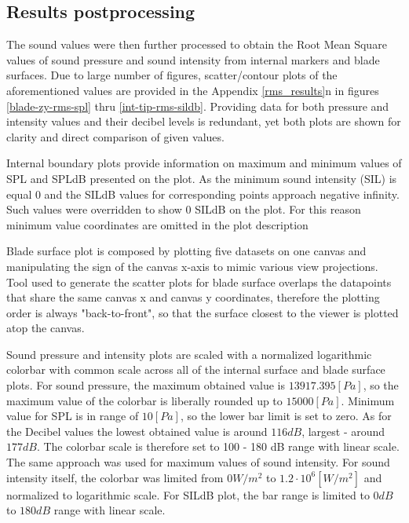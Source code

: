 \subsection{Results postprocessing} \label{rms_res_prep}
The sound values were then further processed to obtain the Root Mean Square values of sound pressure and sound intensity from internal markers and blade surfaces. Due to large number of figures, scatter/contour plots of the aforementioned values are provided in the Appendix \ref{rms_results}n in figures \ref{blade-zy-rms-spl} thru \ref{int-tip-rms-sildb}. Providing data for both pressure and intensity values and their decibel levels is redundant, yet both plots are shown for clarity and direct comparison of given values. 

Internal boundary plots provide information on maximum and minimum values of SPL and SPLdB presented on the plot. As the minimum sound intensity (SIL) is equal 0 and the SILdB values for corresponding points approach negative infinity. Such values were overridden to show 0 SILdB on the plot.    For this reason minimum value coordinates are omitted in the plot description 

Blade surface plot is composed by plotting five datasets on one canvas and manipulating the sign of the canvas x-axis to mimic various view projections. Tool used to generate the scatter plots for blade surface overlaps the datapoints that share the same canvas x and canvas y coordinates, therefore the plotting order is always "back-to-front", so that the surface closest to the viewer is plotted atop the canvas.

Sound pressure and intensity plots are scaled with a normalized logarithmic colorbar with common scale across all of the internal surface and blade surface plots. For sound pressure, the maximum obtained value is $13917.395 [Pa]$, so the maximum value of the colorbar is liberally rounded up to $15000 [Pa]$. Minimum value for SPL is in range of $10 [Pa]$, so the lower bar limit is set to zero. As for the Decibel values the lowest obtained value is around $116 dB$, largest - around $177 dB$. The colorbar scale is therefore set to 100 - 180 dB range with linear scale. The same approach was used for maximum values of sound intensity. For sound intensity itself, the colorbar was limited from $0 W/m^2$ to $1.2 \cdot 10^6 [W/m^2]$ and normalized to logarithmic scale. For SILdB plot, the bar range is limited to $0 dB$ to $180 dB$ range with linear scale. %

